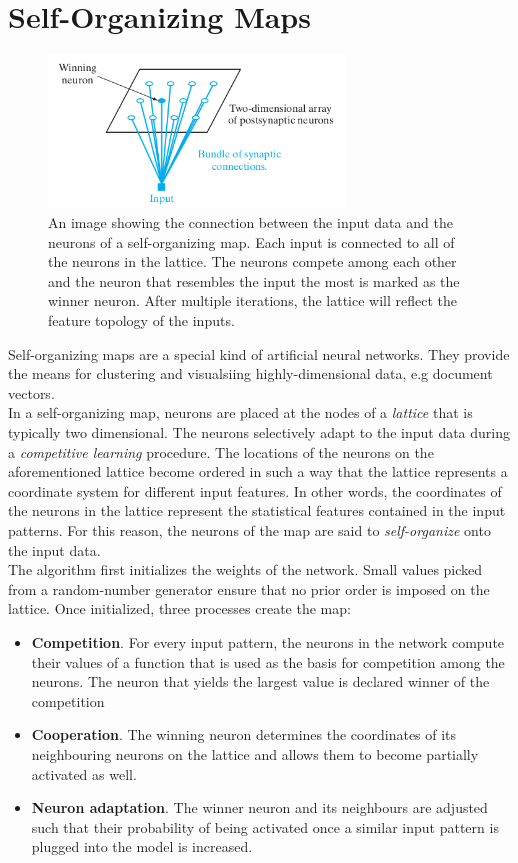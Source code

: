 \documentclass[english]{lni}
\begin{document}
\section{Self-Organizing Maps}
\begin{figure}[H]
    \centering
    \includegraphics[width=0.70\textwidth]{images/kohonen-model.png}
    \caption{An image showing the connection between the input data and the neurons of a self-organizing map.
            Each input is connected to all of the neurons in the lattice. 
            The neurons compete among each other and the neuron that resembles the input the most is 
            marked as the winner neuron. After multiple iterations,
            the lattice will reflect the feature topology of the inputs.}
    \label{fig:kohonen-model}
\end{figure}
Self-organizing maps are a special kind of artificial neural networks. 
They provide the means for clustering and visualsiing highly-dimensional data, e.g document vectors.\\
In a self-organizing map, neurons are placed at the nodes of a \textit{lattice} that is 
typically two dimensional. 
The neurons selectively adapt to the input data during a \textit{competitive learning} procedure.
The locations of the neurons on the aforementioned lattice become ordered in such a way 
that the lattice represents a coordinate system for different input features. 
In other words, the coordinates of the neurons in the lattice represent 
the statistical features contained in the input patterns. 
For this reason, the neurons of the map are said to
\textit{self-organize} onto the input data.\\
The algorithm first initializes the weights of the network. Small values 
picked from a random-number generator ensure that no prior order is imposed 
on the lattice. Once initialized, three processes create the map:
\begin{itemize}
    \item \textbf{Competition}. For every input pattern, the neurons in the network 
    compute their values of a function that is used as the basis for competition 
    among the neurons. The neuron that yields the largest value is declared 
    winner of the competition 
    \item \textbf{Cooperation}. The winning neuron determines the coordinates of its neighbouring
    neurons on the lattice and allows them to become partially activated as well. 
    \item \textbf{Neuron adaptation}. The winner neuron and its neighbours 
    are adjusted such that their probability of being activated once a similar 
    input pattern is plugged into the model is increased.  
\end{itemize}
\end{document}
